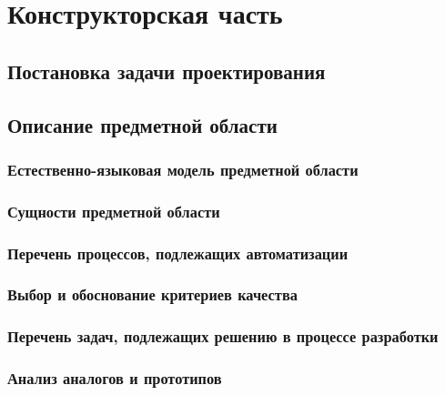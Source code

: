 \section{Конструкторская часть}

\subsection{Постановка задачи проектирования}

\subsection{Описание предметной области}
\subsubsection{Естественно-языковая модель предметной области}
\subsubsection{Сущности предметной области}
\subsubsection{Перечень процессов, подлежащих автоматизации}
\subsubsection{Выбор и обоснование критериев качества}
\subsubsection{Перечень задач, подлежащих решению в процессе разработки}
\subsubsection{Анализ аналогов и прототипов}